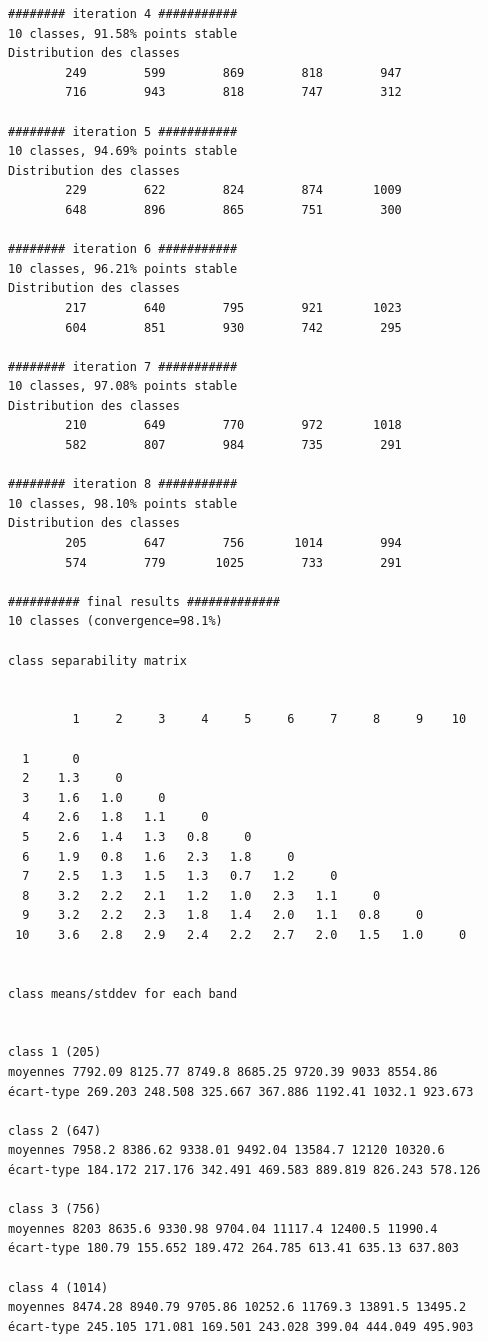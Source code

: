 \documentclass[analytics,article,submit,pdftex,moreauthors]{Definitions/mdpi}
\begin{document}
\begin{footnotesize}
\begin{verbatim}
######## iteration 4 ###########
10 classes, 91.58% points stable
Distribution des classes
        249        599        869        818        947
        716        943        818        747        312

######## iteration 5 ###########
10 classes, 94.69% points stable
Distribution des classes
        229        622        824        874       1009
        648        896        865        751        300

######## iteration 6 ###########
10 classes, 96.21% points stable
Distribution des classes
        217        640        795        921       1023
        604        851        930        742        295

######## iteration 7 ###########
10 classes, 97.08% points stable
Distribution des classes
        210        649        770        972       1018
        582        807        984        735        291

######## iteration 8 ###########
10 classes, 98.10% points stable
Distribution des classes
        205        647        756       1014        994
        574        779       1025        733        291

########## final results #############
10 classes (convergence=98.1%)

class separability matrix


         1     2     3     4     5     6     7     8     9    10

  1      0
  2    1.3     0
  3    1.6   1.0     0
  4    2.6   1.8   1.1     0
  5    2.6   1.4   1.3   0.8     0
  6    1.9   0.8   1.6   2.3   1.8     0
  7    2.5   1.3   1.5   1.3   0.7   1.2     0
  8    3.2   2.2   2.1   1.2   1.0   2.3   1.1     0
  9    3.2   2.2   2.3   1.8   1.4   2.0   1.1   0.8     0
 10    3.6   2.8   2.9   2.4   2.2   2.7   2.0   1.5   1.0     0


class means/stddev for each band


class 1 (205)
moyennes 7792.09 8125.77 8749.8 8685.25 9720.39 9033 8554.86
écart-type 269.203 248.508 325.667 367.886 1192.41 1032.1 923.673

class 2 (647)
moyennes 7958.2 8386.62 9338.01 9492.04 13584.7 12120 10320.6
écart-type 184.172 217.176 342.491 469.583 889.819 826.243 578.126

class 3 (756)
moyennes 8203 8635.6 9330.98 9704.04 11117.4 12400.5 11990.4
écart-type 180.79 155.652 189.472 264.785 613.41 635.13 637.803

class 4 (1014)
moyennes 8474.28 8940.79 9705.86 10252.6 11769.3 13891.5 13495.2
écart-type 245.105 171.081 169.501 243.028 399.04 444.049 495.903


\end{verbatim}
\end{footnotesize}
\end{document}
